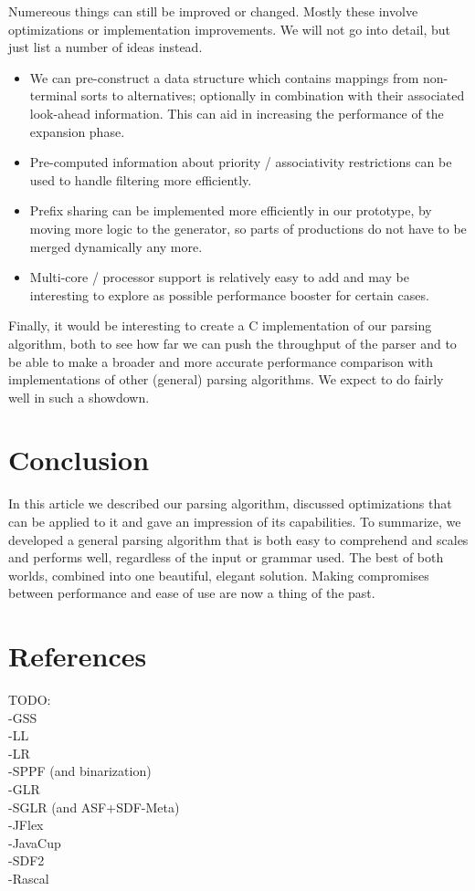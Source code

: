 \documentclass[a4paper,10pt]{article}
\begin{document}
Numereous things can still be improved or changed. Mostly these involve optimizations or implementation improvements. We will not go into detail, but just list a number of ideas instead.

\begin{itemize}
 \setlength{\itemsep}{0pt}
 \setlength{\parskip}{0pt}
 \setlength{\parsep}{0pt}
 
 \item We can pre-construct a data structure which contains mappings from non-terminal sorts to alternatives; optionally in combination with their associated look-ahead information. This can aid in increasing the performance of the expansion phase.
 \item Pre-computed information about priority / associativity restrictions can be used to handle filtering more efficiently.
 \item Prefix sharing can be implemented more efficiently in our prototype, by moving more logic to the generator, so parts of productions do not have to be merged dynamically any more.
 \item Multi-core / processor support is relatively easy to add and may be interesting to explore as possible performance booster for certain cases.
\end{itemize}

Finally, it would be interesting to create a C implementation of our parsing algorithm, both to see how far we can push the throughput of the parser and to be able to make a broader and more accurate performance comparison with implementations of other (general) parsing algorithms. We expect to do fairly well in such a showdown.

\section{Conclusion}

In this article we described our parsing algorithm, discussed optimizations that can be applied to it and gave an impression of its capabilities. To summarize, we developed a general parsing algorithm that is both easy to comprehend and scales and performs well, regardless of the input or grammar used. The best of both worlds, combined into one beautiful, elegant solution. Making compromises between performance and ease of use are now a thing of the past.

\pagebreak
\section{References}

TODO:\\
-GSS\\
-LL\\
-LR\\
-SPPF (and binarization)\\
-GLR\\
-SGLR (and ASF+SDF-Meta)\\
-JFlex\\
-JavaCup\\
-SDF2\\
-Rascal
\end{document}
